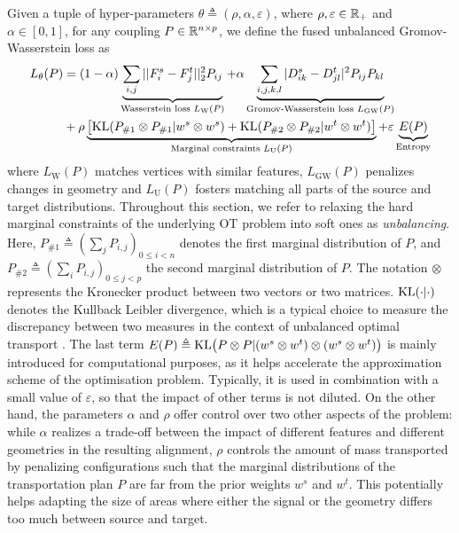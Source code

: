 Given a tuple of hyper-parameters $\theta \triangleq (\rho, \alpha, \varepsilon)$,
where $\rho, \varepsilon \in \mathbb R_+$ and $\alpha \in [0,1]$,
for any coupling $P \in \mathbb R^{n \times p}$,
we define the fused unbalanced Gromov-Wasserstein loss as
\begin{equation}
    \label{eq:fugw_obj_func}
    \begin{split}
        L_{\theta}(P) &=
        (1 - \alpha) \underbrace{\sum_{i,j} || F^s_i - F^t_j||_2^2 P_{ij}}_{\text{Wasserstein loss } L_{\text{W}}(P)}
        + \alpha \underbrace{\sum_{i,j,k,l} | D^s_{ik} - D^t_{jl}|^2 P_{ij} P_{kl}}_{\text{Gromov-Wasserstein loss } L_{\text{GW}}(P)} \\
        &+ \rho \underbrace{\left[ \text{KL}(P_{\# 1} \otimes P_{\# 1} \vert w^s \otimes w^s)
        + \text{KL}(P_{\# 2} \otimes P_{\# 2} \vert w^t \otimes w^t) \right]}_{\text{Marginal constraints } L_{\text{U}}(P)}
        + \varepsilon \underbrace{E(P)}_{\text{Entropy}}
    \end{split}
\end{equation}
where $L_{\text{W}}(P)$ matches vertices with similar features,
$L_{\text{GW}}(P)$ penalizes changes in geometry
and $L_{\text{U}}(P)$ fosters matching all parts of the source and target distributions.
Throughout this section, we refer to relaxing the hard marginal constraints of the underlying
OT problem into soft ones as \textit{unbalancing}.
Here, $P_{\# 1} \triangleq (\sum_j P_{i,j})_{0 \leq i < n}$ denotes
the first marginal distribution of $P$,
and $P_{\# 2} \triangleq (\sum_i P_{i,j})_{0 \leq j < p}$
the second marginal distribution of $P$. The notation $\otimes$ represents
the Kronecker product between two vectors or two matrices.
$\text{KL}(\cdot|\cdot)$ denotes the Kullback Leibler divergence,
which is a typical choice to measure the discrepancy between two measures
in the context of unbalanced optimal transport \citep{Liero18}.
The last term $E(P) \triangleq \text{KL} \big(P \otimes P | (w^s \otimes w^t) \otimes (w^s \otimes w^t)\big)$
is mainly introduced for computational purposes, as it helps accelerate
the approximation scheme of the optimisation problem. Typically,
it is used in combination with a small value of $\varepsilon$,
so that the impact of other terms is not diluted. On the other hand,
the parameters $\alpha$ and $\rho$ offer control over two other aspects of the problem:
while $\alpha$ realizes a trade-off between the impact of different features and
different geometries in the resulting alignment, $\rho$ controls the amount of
mass transported by penalizing configurations such that the marginal distributions
of the transportation plan $P$ are far from the prior weights $w^s$ and $w^t$.
This potentially helps adapting the size of areas where either the signal or the geometry
differs too much between source and target.

